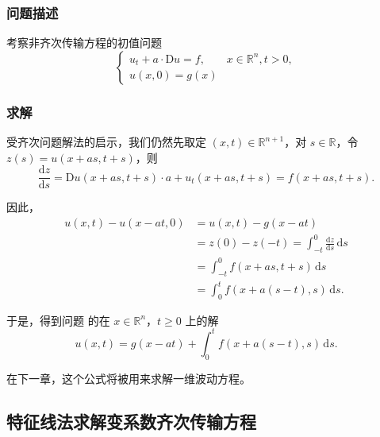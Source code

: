 \documentclass[12pt,a4paper]{article}
\numberwithin{subsection}{section}   %
\numberwithin{subsubsection}{subsection}
\theoremstyle{plain}
\theoremstyle{definition}
\theoremstyle{remark}
\theoremstyle{remark}
\begin{document}
\subsubsection{问题描述}
	考察非齐次传输方程的初值问题
	\begin{equation}
		\begin{cases}
			u_t + a \cdot \mathrm{D}u = f, & x \in \mathbb{R}^n, t > 0, \\
			u(x,0) = g(x)
		\end{cases}
	\end{equation}
	
\subsubsection{求解}
	受齐次问题解法的启示，我们仍然先取定 \((x, t) \in \mathbb{R}^{n+1}\)，对 \(s \in \mathbb{R}\)，令 \(z(s) = u(x + a s, t + s)\)，则
		\begin{equation}
	\frac{\mathrm{d}z}{\mathrm{d}s} = \mathrm{D}u(x + a s, t + s) \cdot a + u_t(x + a s, t + s) = f(x + a s, t + s).
		\end{equation}
	
	因此，
	\begin{equation}
	\begin{aligned}
		u(x, t) -	u(x-at,0)&= u(x, t)-g(x - a t) \\
		&= z(0) - z(-t) = \int_{-t}^0 \frac{\mathrm{d}z}{\mathrm{d}s} \, \mathrm{d}s \\
		&= \int_{-t}^0 f(x + a s, t + s) \, \mathrm{d}s \\
		&= \int_0^t f(x + a (s - t), s) \, \mathrm{d}s.
	\end{aligned}
\end{equation}
	
	于是，得到问题 的在 \(x \in \mathbb{R}^n\)，\(t \geq 0\) 上的解
	\begin{equation}\label{eq:非齐次解1}
		u(x, t) = g(x - a t) + \int_0^t f(x + a (s - t), s) \, \mathrm{d}s.
	\end{equation}
	
	在下一章，这个公式将被用来求解一维波动方程。
	
	
	
	\subsection{特征线法求解变系数齐次传输方程} 
\end{document}
